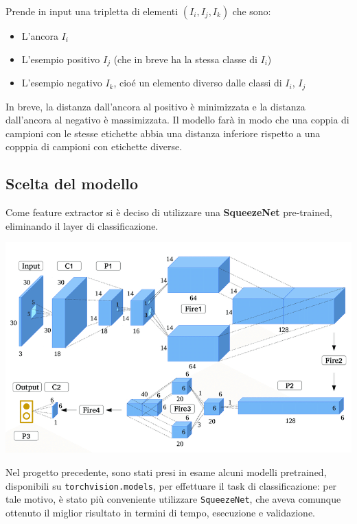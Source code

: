 \documentclass[11pt]{article}
\begin{document}
Prende in input una tripletta di elementi $(I_i, I_j, I_k)$ che sono:

\begin{itemize}
    \item L'ancora $I_i$ 
    \item L'esempio positivo $I_j$ (che in breve ha la stessa classe di $I_i$)
    \item L'esempio negativo $I_k$, cioé un elemento diverso dalle classi di $I_i$, $I_j$
\end{itemize}

In breve, la distanza dall'ancora al positivo è minimizzata e
la distanza dall'ancora al negativo è massimizzata.
Il modello farà in modo che una coppia di campioni con le stesse etichette abbia una distanza inferiore rispetto a una copppia di campioni con etichette diverse.

\subsection{Scelta del modello}

Come feature extractor si è deciso di utilizzare una \textbf{SqueezeNet} pre-trained, eliminando il layer di classificazione.

\begin{center}
    \begin{minipage}{0.48\linewidth}
    \includegraphics[width=\linewidth]{03.png}
    \end{minipage}
\end{center}

Nel progetto precedente, sono stati presi in esame alcuni modelli pretrained, disponibili su
\texttt{torchvision.models}, per effettuare il task di classificazione: per tale motivo,
è stato più conveniente utilizzare \texttt{SqueezeNet}, che aveva comunque ottenuto il miglior risultato
in termini di tempo, esecuzione e validazione.
\end{document}
